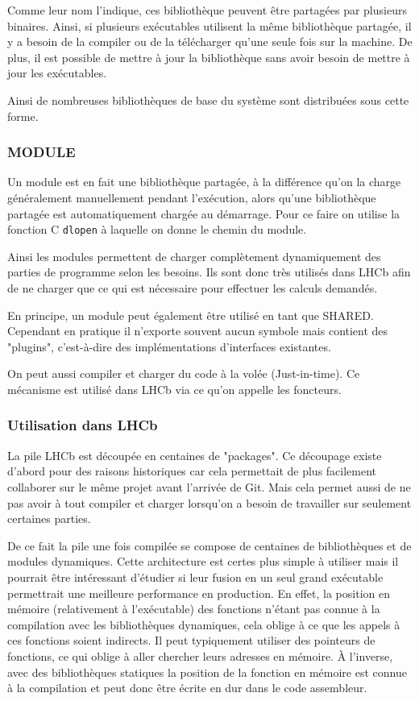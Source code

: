 \documentclass[a4paper,11pt]{report}
\begin{document}
Comme leur nom l'indique, ces bibliothèque peuvent être partagées par plusieurs binaires.
Ainsi, si plusieurs exécutables utilisent la même bibliothèque partagée, il y a besoin de la compiler ou de la télécharger qu'une seule fois sur la machine.
De plus, il est possible de mettre à jour la bibliothèque sans avoir besoin de mettre à jour les exécutables.

Ainsi de nombreuses bibliothèques de base du système sont distribuées sous cette forme.

\subsubsection{MODULE}
Un module est en fait une bibliothèque partagée, à la différence qu'on la charge généralement manuellement pendant l'exécution, alors qu'une bibliothèque partagée est automatiquement chargée au démarrage.
Pour ce faire on utilise la fonction C \verb'dlopen' à laquelle on donne le chemin du module.

Ainsi les modules permettent de charger complètement dynamiquement des parties de programme selon les besoins.
Ils sont donc très utilisés dans LHCb afin de ne charger que ce qui est nécessaire pour effectuer les calculs demandés.

En principe, un module peut également être utilisé en tant que SHARED.
Cependant en pratique il n'exporte souvent aucun symbole mais contient des "plugins", c'est-à-dire des implémentations d'interfaces existantes.

On peut aussi compiler et charger du code à la volée (Just-in-time).
Ce mécanisme est utilisé dans LHCb via ce qu'on appelle les foncteurs.

\subsubsection{Utilisation dans LHCb}
La pile LHCb est découpée en centaines de "packages".
Ce découpage existe d'abord pour des raisons historiques car cela permettait de plus facilement collaborer sur le même projet avant l'arrivée de Git.
Mais cela permet aussi de ne pas avoir à tout compiler et charger lorsqu'on a besoin de travailler sur seulement certaines parties.

De ce fait la pile une fois compilée se compose de centaines de bibliothèques et de modules dynamiques.
Cette architecture est certes plus simple à utiliser mais il pourrait être intéressant d'étudier si leur fusion en un seul grand exécutable permettrait une meilleure performance en production.
En effet, la position en mémoire (relativement à l'exécutable) des fonctions n'étant pas connue à la compilation avec les bibliothèques dynamiques, cela oblige à ce que les appels à ces fonctions soient indirects.
Il peut typiquement utiliser des pointeurs de fonctions, ce qui oblige à aller chercher leurs adresses en mémoire.
À l'inverse, avec des bibliothèques statiques la position de la fonction en mémoire est connue à la compilation et peut donc être écrite en dur dans le code assembleur.
\end{document}
